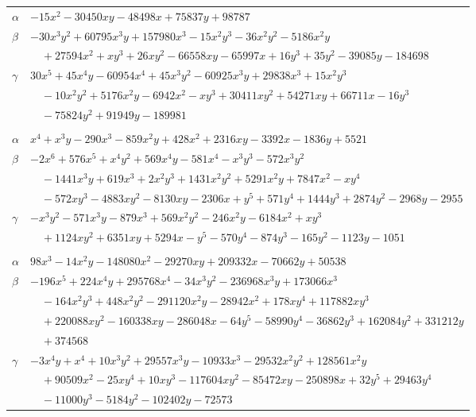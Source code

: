 \documentclass[11pt]{article}
\begin{document}
\begin{longtable}{@{}ll@{}}
$\alpha$ & $-15x^{2}-30450xy-48498x+75837y+98787$\\
$\beta$ & $-30x^{3}y^{2}+60795x^{3}y+157980x^{3}-15x^{2}y^{3}-36x^{2}y^{2}-5186x^{2}y$\\
 & $\quad +27594x^{2}+xy^{3}+26xy^{2}-66558xy-65997x+16y^{3}+35y^{2}-39085y-184698$\\
$\gamma$ & $30x^{5}+45x^{4}y-60954x^{4}+45x^{3}y^{2}-60925x^{3}y+29838x^{3}+15x^{2}y^{3}$\\
 & $\quad -10x^{2}y^{2}+5176x^{2}y-6942x^{2}-xy^{3}+30411xy^{2}+54271xy+66711x-16y^{3}$\\
 & $\quad -75824y^{2}+91949y-189981$\\
\addlinespace[3pt]
\multicolumn{2}{@{}l}{$\{i,j\}=\{42,128\}$, $k_{ij}=2^{3}\cdot 3^{5}\cdot 7$}\\
$\alpha$ & $x^{4}+x^{3}y-290x^{3}-859x^{2}y+428x^{2}+2316xy-3392x-1836y+5521$\\
$\beta$ & $-2x^{6}+576x^{5}+x^{4}y^{2}+569x^{4}y-581x^{4}-x^{3}y^{3}-572x^{3}y^{2}$\\
 & $\quad -1441x^{3}y+619x^{3}+2x^{2}y^{3}+1431x^{2}y^{2}+5291x^{2}y+7847x^{2}-xy^{4}$\\
 & $\quad -572xy^{3}-4883xy^{2}-8130xy-2306x+y^{5}+571y^{4}+1444y^{3}+2874y^{2}-2968y-2955$\\
$\gamma$ & $-x^{3}y^{2}-571x^{3}y-879x^{3}+569x^{2}y^{2}-246x^{2}y-6184x^{2}+xy^{3}$\\
 & $\quad +1124xy^{2}+6351xy+5294x-y^{5}-570y^{4}-874y^{3}-165y^{2}-1123y-1051$\\
\addlinespace[3pt]
\multicolumn{2}{@{}l}{$\{i,j\}=\{42,130\}$, $k_{ij}=2^{5}\cdot 3^{4}\cdot 7\cdot 37$}\\
$\alpha$ & $98x^{3}-14x^{2}y-148080x^{2}-29270xy+209332x-70662y+50538$\\
$\beta$ & $-196x^{5}+224x^{4}y+295768x^{4}-34x^{3}y^{2}-236968x^{3}y+173066x^{3}$\\
 & $\quad -164x^{2}y^{3}+448x^{2}y^{2}-291120x^{2}y-28942x^{2}+178xy^{4}+117882xy^{3}$\\
 & $\quad +220088xy^{2}-160338xy-286048x-64y^{5}-58990y^{4}-36862y^{3}+162084y^{2}+331212y$\\
 & $\quad +374568$\\
$\gamma$ & $-3x^{4}y+x^{4}+10x^{3}y^{2}+29557x^{3}y-10933x^{3}-29532x^{2}y^{2}+128561x^{2}y$\\
 & $\quad +90509x^{2}-25xy^{4}+10xy^{3}-117604xy^{2}-85472xy-250898x+32y^{5}+29463y^{4}$\\
 & $\quad -11000y^{3}-5184y^{2}-102402y-72573$\\

\end{longtable}
\end{document}
